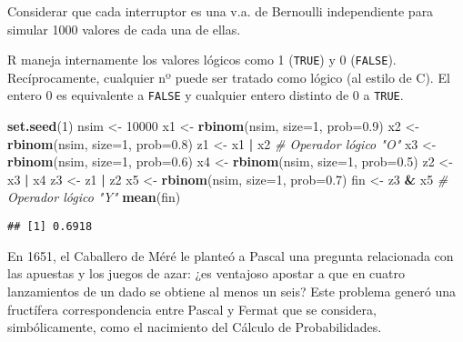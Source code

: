 \documentclass[
]{book}
\newenvironment{Shaded}{\begin{snugshade}}{\end{snugshade}}
\newcommand{\CommentTok}[1]{\textcolor[rgb]{0.56,0.35,0.01}{\textit{#1}}}
\newcommand{\DataTypeTok}[1]{\textcolor[rgb]{0.13,0.29,0.53}{#1}}
\newcommand{\DecValTok}[1]{\textcolor[rgb]{0.00,0.00,0.81}{#1}}
\newcommand{\FloatTok}[1]{\textcolor[rgb]{0.00,0.00,0.81}{#1}}
\newcommand{\KeywordTok}[1]{\textcolor[rgb]{0.13,0.29,0.53}{\textbf{#1}}}
\newcommand{\NormalTok}[1]{#1}
\newcommand{\OperatorTok}[1]{\textcolor[rgb]{0.81,0.36,0.00}{\textbf{#1}}}
\newcommand{\StringTok}[1]{\textcolor[rgb]{0.31,0.60,0.02}{#1}}
\theoremstyle{break}
\theoremstyle{definition}
\theoremstyle{definition}
\theoremstyle{definition}
\theoremstyle{remark}
\let\BeginKnitrBlock\begin \let\EndKnitrBlock\end
\begin{document}
Considerar que cada interruptor es una v.a. de Bernoulli independiente
para simular 1000 valores de cada una de ellas.

\BeginKnitrBlock{remark}
\iffalse{} {Nota: } \fi{}R maneja internamente los valores lógicos como 1 (\texttt{TRUE}) y 0 (\texttt{FALSE}).
Recíprocamente, cualquier nº puede ser tratado como lógico (al estilo de C).
El entero 0 es equivalente a \texttt{FALSE} y cualquier entero distinto de 0 a \texttt{TRUE}.
\EndKnitrBlock{remark}

\begin{Shaded}
\begin{Highlighting}[]
\KeywordTok{set.seed}\NormalTok{(}\DecValTok{1}\NormalTok{)}
\NormalTok{nsim <-}\StringTok{ }\DecValTok{10000}
\NormalTok{x1 <-}\StringTok{ }\KeywordTok{rbinom}\NormalTok{(nsim, }\DataTypeTok{size=}\DecValTok{1}\NormalTok{, }\DataTypeTok{prob=}\FloatTok{0.9}\NormalTok{)}
\NormalTok{x2 <-}\StringTok{ }\KeywordTok{rbinom}\NormalTok{(nsim, }\DataTypeTok{size=}\DecValTok{1}\NormalTok{, }\DataTypeTok{prob=}\FloatTok{0.8}\NormalTok{)}
\NormalTok{z1 <-}\StringTok{ }\NormalTok{x1 }\OperatorTok{|}\StringTok{ }\NormalTok{x2   }\CommentTok{# Operador lógico "O"}
\NormalTok{x3 <-}\StringTok{ }\KeywordTok{rbinom}\NormalTok{(nsim, }\DataTypeTok{size=}\DecValTok{1}\NormalTok{, }\DataTypeTok{prob=}\FloatTok{0.6}\NormalTok{)}
\NormalTok{x4 <-}\StringTok{ }\KeywordTok{rbinom}\NormalTok{(nsim, }\DataTypeTok{size=}\DecValTok{1}\NormalTok{, }\DataTypeTok{prob=}\FloatTok{0.5}\NormalTok{)}
\NormalTok{z2 <-}\StringTok{ }\NormalTok{x3 }\OperatorTok{|}\StringTok{ }\NormalTok{x4}
\NormalTok{z3 <-}\StringTok{ }\NormalTok{z1 }\OperatorTok{|}\StringTok{ }\NormalTok{z2}
\NormalTok{x5 <-}\StringTok{ }\KeywordTok{rbinom}\NormalTok{(nsim, }\DataTypeTok{size=}\DecValTok{1}\NormalTok{, }\DataTypeTok{prob=}\FloatTok{0.7}\NormalTok{)}
\NormalTok{fin <-}\StringTok{ }\NormalTok{z3 }\OperatorTok{&}\StringTok{ }\NormalTok{x5  }\CommentTok{# Operador lógico "Y"}
\KeywordTok{mean}\NormalTok{(fin)}
\end{Highlighting}
\end{Shaded}

\begin{verbatim}
## [1] 0.6918
\end{verbatim}

\BeginKnitrBlock{exercise}
\protect\hypertarget{exr:unnamed-chunk-16}{}{\label{exr:unnamed-chunk-16} }
\EndKnitrBlock{exercise}

En 1651, el Caballero de Méré le planteó a Pascal una pregunta
relacionada con las apuestas y los juegos de azar: ¿es ventajoso
apostar a que en cuatro lanzamientos de un dado se obtiene al menos
un seis? Este problema generó una fructífera correspondencia entre
Pascal y Fermat que se considera, simbólicamente, como el nacimiento
del Cálculo de Probabilidades.
\end{document}
